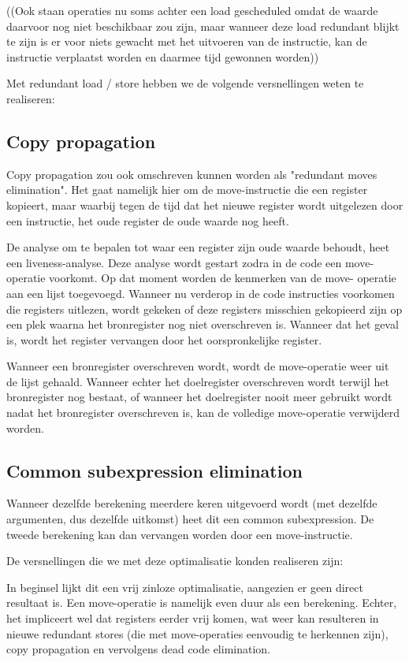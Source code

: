 \documentclass[a4paper,10pt]{article}
\begin{document}
((Ook staan operaties nu soms achter een load
gescheduled omdat de waarde daarvoor nog niet beschikbaar zou zijn, maar
wanneer deze load redundant blijkt te zijn is er voor niets gewacht met het
uitvoeren van de instructie, kan de instructie verplaatst worden en daarmee
tijd gewonnen worden))

Met redundant load / store hebben we de volgende versnellingen weten te
realiseren:

\subsection{Copy propagation}
Copy propagation zou ook omschreven kunnen worden als "redundant moves
elimination". Het gaat namelijk hier om de move-instructie die een register 
kopieert, maar waarbij tegen de tijd dat het nieuwe register wordt 
uitgelezen door een instructie, het oude register de oude waarde nog heeft.

De analyse om te bepalen tot waar een register zijn oude waarde behoudt, 
heet een liveness-analyse. Deze analyse wordt gestart zodra in de code een
move-operatie voorkomt. Op dat moment worden de kenmerken van de move-
operatie aan een lijst toegevoegd. Wanneer nu verderop in de code 
instructies voorkomen die registers uitlezen, wordt gekeken of deze 
registers misschien gekopieerd zijn op een plek waarna het bronregister nog 
niet overschreven is. Wanneer dat het geval is, wordt het register vervangen
door het oorspronkelijke register.

Wanneer een bronregister overschreven wordt, wordt de move-operatie weer uit de
lijst gehaald. Wanneer echter het doelregister overschreven wordt terwijl het
bronregister nog bestaat, of wanneer het doelregister nooit meer gebruikt wordt
nadat het bronregister overschreven is, kan de volledige move-operatie
verwijderd worden.

\subsection{Common subexpression elimination}
Wanneer dezelfde berekening meerdere keren uitgevoerd wordt (met dezelfde
argumenten, dus dezelfde uitkomst) heet dit een common subexpression. De 
tweede berekening kan dan vervangen worden door een move-instructie.

De versnellingen die we met deze optimalisatie konden realiseren zijn:

In beginsel lijkt dit een vrij zinloze optimalisatie, aangezien er geen 
direct resultaat is. Een move-operatie is namelijk even duur als een
berekening. Echter, het impliceert wel dat registers eerder vrij komen, wat
weer kan resulteren in nieuwe redundant stores (die met move-operaties
eenvoudig te herkennen zijn), copy propagation en vervolgens dead code
elimination.
\end{document}
